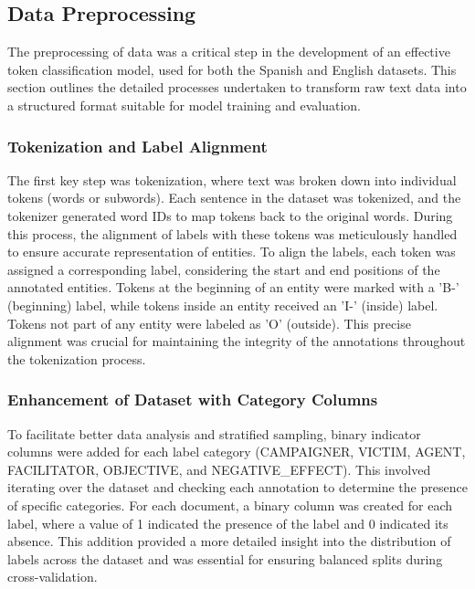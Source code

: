 \documentclass{Configuration_Files/PoliMi3i_thesis}
\begin{document}
\subsection{Data Preprocessing} \label{sec:data_preprocessing_T2}
The preprocessing of data was a critical step in the development of an effective token classification model, used for both the Spanish and English datasets. This section outlines the detailed processes undertaken to transform raw text data into a structured format suitable for model training and evaluation.

\subsubsection{Tokenization and Label Alignment} \label{subsec:tokenization_and_label_alignment_T2}
The first key step was tokenization, where text was broken down into individual tokens (words or subwords). Each sentence in the dataset was tokenized, and the tokenizer generated word IDs to map tokens back to the original words. During this process, the alignment of labels with these tokens was meticulously handled to ensure accurate representation of entities. To align the labels, each token was assigned a corresponding label, considering the start and end positions of the annotated entities. Tokens at the beginning of an entity were marked with a 'B-' (beginning) label, while tokens inside an entity received an 'I-' (inside) label. Tokens not part of any entity were labeled as 'O' (outside). This precise alignment was crucial for maintaining the integrity of the annotations throughout the tokenization process.

\subsubsection{Enhancement of Dataset with Category Columns} \label{subsec:category_oolumn_T2}
To facilitate better data analysis and stratified sampling, binary indicator columns were added for each label category (CAMPAIGNER, VICTIM, AGENT, FACILITATOR, OBJECTIVE, and NEGATIVE\_EFFECT). This involved iterating over the dataset and checking each annotation to determine the presence of specific categories. For each document, a binary column was created for each label, where a value of 1 indicated the presence of the label and 0 indicated its absence. This addition provided a more detailed insight into the distribution of labels across the dataset and was essential for ensuring balanced splits during cross-validation.
\end{document}

